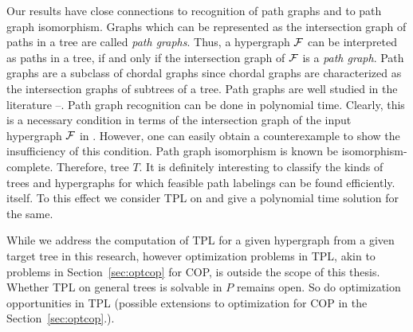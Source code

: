Our results have close connections to recognition of path graphs and
to path graph isomorphism.  Graphs which can be represented as the
intersection graph of paths in a tree are called {\em path
  graphs}\cite{mcg04}. Thus, a hypergraph ${\cal F}$ can be interpreted as
paths in a tree, if and only if the intersection graph of ${\cal F}$ is a
{\em path graph}. Path graphs are a subclass of chordal graphs since
chordal graphs are characterized as the intersection graphs of
subtrees of a tree\cite{mcg04}.  Path graphs are well studied in the
literature \cite{plr70}--\cite{mcg04}.  Path graph recognition can be done in
polynomial time\cite{gav78,aas93}.  Clearly, this is a necessary
condition in terms of the intersection graph of the input hypergraph
${\cal F}$ in \FTPL. However, one can easily obtain a counterexample to
show the insufficiency of this condition.  Path graph isomorphism is known be
isomorphism-complete\cite{kklv10}. Therefore,  tree $T$.  It is
definitely interesting to classify the kinds of trees and hypergraphs
for which feasible path labelings can be  found
efficiently.   itself.  To this effect
we consider TPL on {\kstar} and give a polynomial time solution for
the same.


While we address the computation of TPL for a given
hypergraph%
from a given target tree in this research, however optimization
problems in TPL, akin to problems in Section~\ref{sec:optcop} for COP,
is outside the scope of this thesis. Whether TPL on general trees is
solvable in $P$ remains open. So do optimization opportunities in TPL
(possible extensions to optimization for COP in the
Section~\ref{sec:optcop}.).


